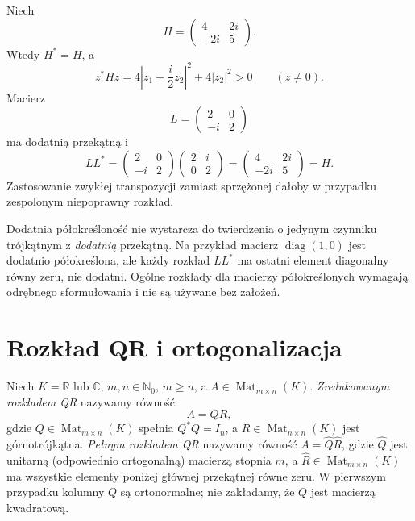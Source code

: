 \begin{przyklad}
\label{prz:lin15-cholesky}
Niech
\[
 H=\begin{pmatrix}4&2i\\-2i&5\end{pmatrix}.
\]
Wtedy \(H^*=H\), a
\[
 z^*Hz=
 4\left|z_1+\frac i2z_2\right|^2
 +4|z_2|^2>0
 \qquad(z\ne0).
\]
Macierz
\[
 L=\begin{pmatrix}2&0\\-i&2\end{pmatrix}
\]
ma dodatnią przekątną i
\[
 LL^*=
 \begin{pmatrix}2&0\\-i&2\end{pmatrix}
 \begin{pmatrix}2&i\\0&2\end{pmatrix}
 =\begin{pmatrix}4&2i\\-2i&5\end{pmatrix}=H.
\]
Zastosowanie zwykłej transpozycji
zamiast sprzężonej dałoby
w przypadku zespolonym
niepoprawny rozkład.
\end{przyklad}

\begin{uwaga}
\label{rem:lin15-cholesky-psd}
Dodatnia półokreśloność nie wystarcza
do twierdzenia o jedynym czynniku
trójkątnym z \emph{dodatnią}
przekątną. Na przykład
macierz \(\operatorname{diag}(1,0)\)
jest dodatnio półokreślona,
ale każdy rozkład \(LL^*\)
ma ostatni element diagonalny
równy zeru, nie dodatni.
Ogólne rozkłady dla macierzy
półokreślonych wymagają odrębnego
sformułowania i nie są
używane bez założeń.
\end{uwaga}


\section{Rozkład QR i ortogonalizacja}
\label{sec:lin15-qr}

\begin{definicja}[Rozkład QR]
\label{def:lin15-qr}
Niech \(K=\mathbb R\) lub \(\mathbb C\),
\(m,n\in\mathbb N_0\), \(m\ge n\),
a \(A\in\operatorname{Mat}_{m\times n}(K)\).
\emph{Zredukowanym rozkładem QR}
nazywamy równość
\[
 A=QR,
\]
gdzie
\(Q\in\operatorname{Mat}_{m\times n}(K)\)
spełnia \(Q^*Q=I_n\),
a \(R\in\operatorname{Mat}_{n\times n}(K)\)
jest górnotrójkątna.
\emph{Pełnym rozkładem QR}
nazywamy równość \(A=\widehat Q\widehat R\),
gdzie \(\widehat Q\) jest
unitarną (odpowiednio ortogonalną)
macierzą stopnia \(m\),
a \(\widehat R\in
\operatorname{Mat}_{m\times n}(K)\)
ma wszystkie elementy
poniżej głównej przekątnej równe zeru.
W pierwszym przypadku
kolumny \(Q\) są ortonormalne;
nie zakładamy, że \(Q\)
jest macierzą kwadratową.
\end{definicja}

